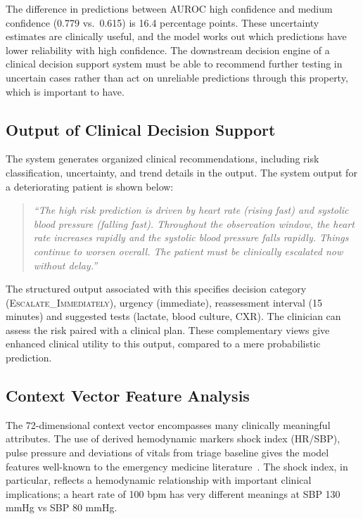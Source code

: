 \documentclass[conference]{IEEEtran}
\begin{document}
The difference in predictions between AUROC high confidence and medium confidence (0.779 vs.\ 0.615) is 16.4 percentage points. These uncertainty estimates are clinically useful, and the model works out which predictions have lower reliability with high confidence. The downstream decision engine of a clinical decision support system must be able to recommend further testing in uncertain cases rather than act on unreliable predictions through this property, which is important to have.

\subsection{Output of Clinical Decision Support}

The system generates organized clinical recommendations, including risk classification, uncertainty, and trend details in the output. The system output for a deteriorating patient is shown below:

\begin{quote}
\textit{``The high risk prediction is driven by heart rate (rising fast) and systolic blood pressure (falling fast). Throughout the observation window, the heart rate increases rapidly and the systolic blood pressure falls rapidly. Things continue to worsen overall. The patient must be clinically escalated now without delay.''}
\end{quote}

The structured output associated with this specifies decision category (\textsc{Escalate\_Immediately}), urgency (immediate), reassessment interval (15 minutes) and suggested tests (lactate, blood culture, CXR). The clinician can assess the risk paired with a clinical plan. These complementary views give enhanced clinical utility to this output, compared to a mere probabilistic prediction.

\subsection{Context Vector Feature Analysis}

The 72-dimensional context vector encompasses many clinically meaningful attributes. The use of derived hemodynamic markers shock index (HR/SBP), pulse pressure and deviations of vitals from triage baseline gives the model features well-known to the emergency medicine literature~\cite{Koch2019}. The shock index, in particular, reflects a hemodynamic relationship with important clinical implications; a heart rate of 100 bpm has very different meanings at SBP 130 mmHg vs SBP 80 mmHg.
\end{document}
